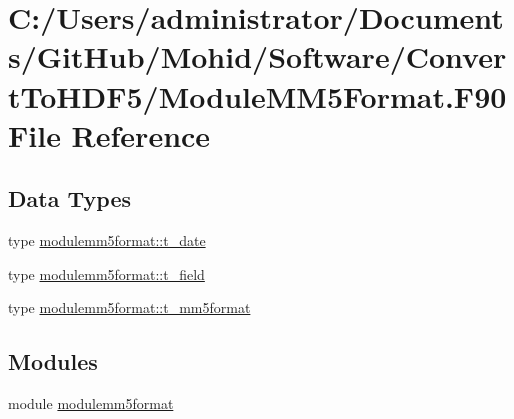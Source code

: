 \hypertarget{_module_m_m5_format_8_f90}{}\section{C\+:/\+Users/administrator/\+Documents/\+Git\+Hub/\+Mohid/\+Software/\+Convert\+To\+H\+D\+F5/\+Module\+M\+M5\+Format.F90 File Reference}
\label{_module_m_m5_format_8_f90}
\subsection*{Data Types}
\begin{DoxyCompactItemize}
\item 
type \mbox{\hyperlink{structmodulemm5format_1_1t__date}{modulemm5format\+::t\+\_\+date}}
\item 
type \mbox{\hyperlink{structmodulemm5format_1_1t__field}{modulemm5format\+::t\+\_\+field}}
\item 
type \mbox{\hyperlink{structmodulemm5format_1_1t__mm5format}{modulemm5format\+::t\+\_\+mm5format}}
\end{DoxyCompactItemize}
\subsection*{Modules}
\begin{DoxyCompactItemize}
\item 
module \mbox{\hyperlink{namespacemodulemm5format}{modulemm5format}}
\end{DoxyCompactItemize}
